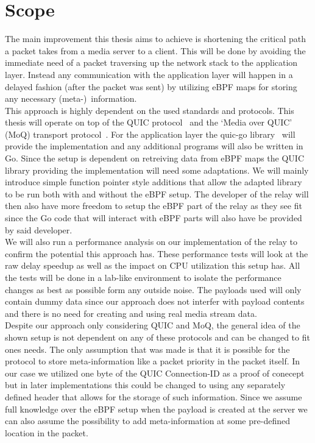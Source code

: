 \section{Scope}\label{sec:scope}

The main improvement this thesis aims to achieve is shortening the critical path a packet takes from a media server to a client.
This will be done by avoiding the immediate need of a packet traversing up the network stack to the application layer.
Instead any communication with the application layer will happen in a delayed fashion (after the packet was sent) by utilizing 
eBPF maps for storing any necessary (meta-)~information.
\\
This approach is highly dependent on the used standards and protocols.
This thesis will operate on top of the QUIC protocol~\parencite{rfc-9000} and the `Media over QUIC' (MoQ) 
transport protocol~\parencite{draft-moqtransport}.
For the application layer the quic-go library~\parencite{quic-go-repo} will provide the implementation and 
any additional programs will also be written in Go.
Since the setup is dependent on retreiving data from eBPF maps the QUIC library providing the implementation 
will need some adaptations.
We will mainly introduce simple function pointer style additions that allow the adapted library to be run 
both with and without the eBPF setup.
The developer of the relay will then also have more freedom to setup the eBPF part of the relay as they see fit
since the Go code that will interact with eBPF parts will also have be provided by said developer.
\\
We will also run a performance analysis on our implementation of the relay to confirm the potential this 
approach has.
These performance tests will look at the raw delay speedup as well as the impact on CPU utilization this 
setup has.
All the tests will be done in a lab-like environment to isolate the performance changes as best as possible
form any outside noise.
The payloads used will only contain dummy data since our approach does not interfer with payload contents 
and there is no need for creating and using real media stream data.
\\
Despite our approach only considering QUIC and MoQ, the general idea of the shown setup is not dependent on 
any of these protocols and can be changed to fit ones needs.
The only assumption that was made is that it is possible for the protocol to store meta-information like a packet
priority in the packet itself.
In our case we utilized one byte of the QUIC Connection-ID as a proof of conecept but in later implementations 
this could be changed to using any separately defined header that allows for the storage of such information.
Since we assume full knowledge over the eBPF setup when the payload is created at the server we can also 
assume the possibility to add meta-information at some pre-defined location in the packet.
